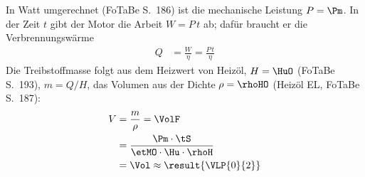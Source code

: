In Watt umgerechnet (FoTaBe S.~186) ist die mechanische Leistung $P = \Pm$. In der Zeit $t$ gibt der Motor die Arbeit $W = P\,t$ ab; dafür braucht er die Verbrennungswärme
\begin{align}
 Q &= \frac{W}{\eta} = \frac{P\,t}{\eta}
\end{align}
Die Treibstoffmasse folgt aus dem Heizwert von Heizöl, $H = \HuO$ (FoTaBe S.~193), $m = Q/H$, das Volumen aus der Dichte $\rho = \rhoHO$ (Heizöl EL, FoTaBe S.~187):
\begin{align}
 V &= \frac{m}{\rho} = \VolF \\
   &= \frac{\Pm\cdot\tS}{\etMO\cdot\Hu\cdot\rhoH} \\
   &= \Vol \approx \result{\VLP{0}{2}}
\end{align}
